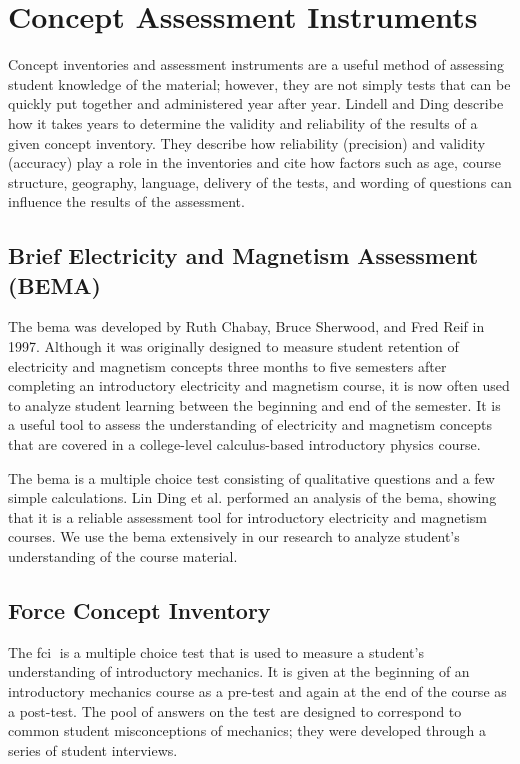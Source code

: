 \section{Concept Assessment Instruments}

Concept inventories and assessment instruments are a useful method of assessing student knowledge of the material; however, they are not simply tests that can be quickly put together and administered year after year. Lindell and Ding describe how it takes years to determine the validity and reliability of the results of a given concept inventory. They describe how reliability (precision) and validity (accuracy) play a role in the inventories and cite how factors such as age, course structure, geography, language, delivery of the tests, and wording of questions can influence the results of the assessment\cite{lindell2012}.

\subsection{Brief Electricity and Magnetism Assessment (BEMA)}

The \gls{bema} was developed by Ruth Chabay, Bruce Sherwood, and Fred Reif in 1997. Although it was originally designed to measure student retention of electricity and magnetism concepts three months to five semesters after completing an introductory electricity and magnetism course, it is now often used to analyze student learning between the beginning and end of the semester. It is a useful tool to assess the understanding of electricity and magnetism concepts that are covered in a college-level calculus-based introductory physics course\cite{ding2006}.

The \gls{bema} is a multiple choice test consisting of qualitative questions and a few simple calculations. Lin Ding et al. performed an analysis of the \gls{bema}, showing that it is a reliable assessment tool for introductory electricity and magnetism courses\cite{ding2006}. We use the \gls{bema} extensively in our research to analyze student's understanding of the course material.

\subsection{Force Concept Inventory}

The \gls{fci}􏰁 is a multiple choice test that is used to measure a student's understanding of introductory mechanics. It is given at the beginning of an introductory mechanics course as a pre-test and again at the end of the course as a post-test. The pool of answers on the test are designed to correspond to common student misconceptions of mechanics; they were developed through a series of student interviews\cite{hestenes1992}.

